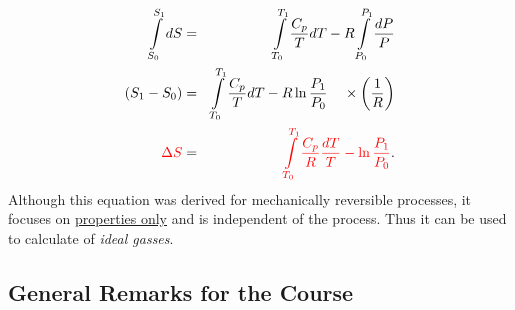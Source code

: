 \documentclass[12pts,a4paper,amsmath,amssymb,floatfix]{article}%
\newcommand{\frc}{\displaystyle\frac}
\newcommand{\red}{\textcolor{red}}
\begin{document}
\begin{enumerate}[i)]
\begin{eqnarray}
                    \int\limits_{S_{0}}^{S_{1}} dS &=& \int\limits_{T_{0}}^{T_{1}} \frc{C_{p}}{T}dT - R\int\limits_{P_{0}}^{P_{1}}\frc{dP}{P} \nonumber \\
                    \left(S_{1}-S_{0}\right) &=& \int\limits_{T_{0}}^{T_{1}} \frc{C_{p}}{T}dT - R\ln{\frc{P_{1}}{P_{0}}} \;\;\;\;\times\left(\frc{1}{R}\right) \nonumber \\
                    \red{\Delta S} &=& \red{\int\limits_{T_{0}}^{T_{1}} \frc{C_{p}}{R}\frc{dT}{T} - \ln{\frc{P_{1}}{P_{0}}} }.
                \end{eqnarray}
           Although this equation was derived for mechanically reversible processes, it focuses on \underline{properties only} and is independent of the process. Thus it can be used to calculate of {\it ideal gasses}.

               
%
   \end{enumerate}

\subsection{General Remarks for the Course}
\end{document}
